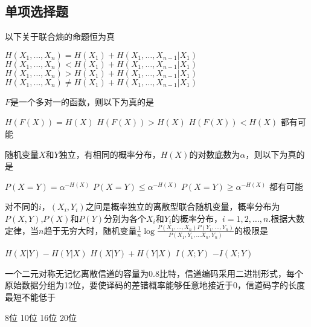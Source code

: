 \documentclass[a4paper]{exam}
\newif\ifprint
\newcommand{\blank}[2][1cm]{\uline{\makebox[#1][c]{%
  \ifprint
    \phantom{#2}%
  \else
    #2%
  \fi}}}
\begin{document}
\begin{CJK*}{UTF8}{gbsn}

\section*{单项选择题}
\begin{questions}
\question 以下关于联合熵的命题\blank{C}恒为真
    \begin{choices}
        \choice $H({X_1}, \ldots ,{X_n}) = H({X_1}) + H({X_1}, \ldots ,{X_{n - 1}}|{X_1})$
        \choice $H({X_1}, \ldots ,{X_n}) < H({X_1}) + H({X_1}, \ldots ,{X_{n - 1}}|{X_1})$
        \choice $H({X_1}, \ldots ,{X_n}) > H({X_1}) + H({X_1}, \ldots ,{X_{n - 1}}|{X_1})$
        \choice $H({X_1}, \ldots ,{X_n}) \ne H({X_1}) + H({X_1}, \ldots ,{X_{n - 1}}|{X_1})$\\
    \end{choices}
\question
$F$是一个多对一的函数，则以下为真的是\blank{C}
    \begin{choices}
        \choice $H(F(X)) = H(X)$
        \choice $H(F(X)) > H(X)$
        \choice $H(F(X)) < H(X)$
        \choice 都有可能\\
    \end{choices}

\question
随机变量$X$和$Y$独立，有相同的概率分布，$H(X)$的对数底数为$\alpha$，则以下为真的是\blank{B}
    \begin{choices}
        \choice $P(X = Y) = {\alpha ^{ - H(X)}}$
        \choice $P(X = Y) \le {\alpha ^{ - H(X)}}$
        \choice $P(X = Y) \ge {\alpha ^{ - H(X)}}$
        \choice 都有可能\\
    \end{choices}

\question 
对不同的$i$，$\left( {{X_i},{Y_i}} \right)$之间是概率独立的离散型联合随机变量，概率分布为$P(X,Y)$,$P(X)$和$P(Y)$分别为各个$X_i$和$Y_i$的概率分布，$i = 1,2, \ldots ,n$.根据大数定律，当$n$趋于无穷大时，随机变量$\frac{1}{n}\log \frac{{P\left( {{X_1}, \ldots ,{X_n}} \right)P\left( {{Y_1}, \ldots ,{Y_n}} \right)}}{{P({X_1},{Y_1}, \ldots {X_n},{Y_n})}}$的极限是\blank{C}
    \begin{choices}
        \choice $H(X|Y) - H(Y|X)$
        \choice $H(X|Y) + H(Y|X)$
        \choice $I(X;Y)$
        \choice $-I(X;Y)$\\
    \end{choices}

\question
一个二元对称无记忆离散信道的容量为0.8比特，信道编码采用二进制形式，每个原始数据分组为12位，要使译码的差错概率能够任意地接近于0，信道码字的长度最短不能低于\blank{C}
    \begin{choices}
        \choice 8位
        \choice 10位
        \choice 16位
        \choice 20位
    \end{choices}
\end{questions}


\end{CJK*}
\end{document}
